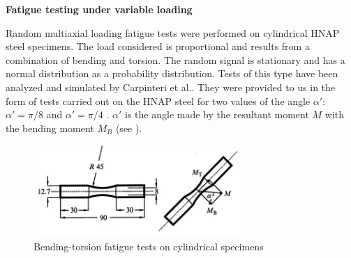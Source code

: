 \noindent
\textbf{Fatigue testing under variable loading}

Random multiaxial loading fatigue tests were performed on cylindrical HNAP steel specimens\cite{ACHTELIC1994}. The load considered is proportional and results from a combination of bending and torsion. The random signal is stationary and has a normal distribution as a probability distribution. Tests of this type have been analyzed and simulated by Carpinteri et al.\cite{carpinteri2003multiaxial}. They were provided to us in the form of tests carried out on the HNAP steel for two values of the angle $\alpha'$: $\alpha' = \pi / 8$ and $\alpha' = \pi / 4$ . $\alpha' $ is the angle made by the resultant moment $M$ with the bending moment $M_B$ (see ).

\begin{figure}[!h]
\centering
\includegraphics[width=0.7\textwidth]{figures//10HNAPsample.png} 
\caption{Bending-torsion fatigue tests on cylindrical specimens\cite{carpinteri2003multiaxial}}
\label{fig.10HNAPsample}
\end{figure}

